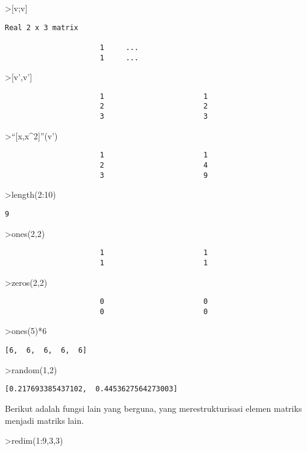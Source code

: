 \documentclass[
]{book}
\begin{document}
\textgreater{[}v;v{]}

\begin{verbatim}
Real 2 x 3 matrix

                      1     ...
                      1     ...
\end{verbatim}

\textgreater{[}v',v'{]}

\begin{verbatim}
                      1                       1 
                      2                       2 
                      3                       3 
\end{verbatim}

\textgreater{}``{[}x,x\^{}2{]}''(v')

\begin{verbatim}
                      1                       1 
                      2                       4 
                      3                       9 
\end{verbatim}

\textgreater length(2:10)

\begin{verbatim}
9
\end{verbatim}

\textgreater ones(2,2)

\begin{verbatim}
                      1                       1 
                      1                       1 
\end{verbatim}

\textgreater zeros(2,2)

\begin{verbatim}
                      0                       0 
                      0                       0 
\end{verbatim}

\textgreater ones(5)*6

\begin{verbatim}
[6,  6,  6,  6,  6]
\end{verbatim}

\textgreater random(1,2)

\begin{verbatim}
[0.217693385437102,  0.4453627564273003]
\end{verbatim}

Berikut adalah fungsi lain yang berguna, yang merestrukturisasi elemen matriks menjadi matriks lain.

\textgreater redim(1:9,3,3)
\end{document}
